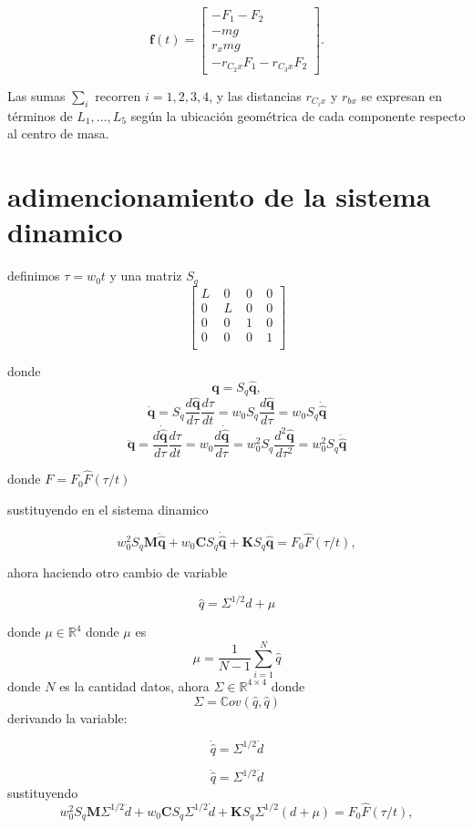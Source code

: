 \[
\mathbf f(t)=\begin{bmatrix} -F_1-F_2\\ -mg\\ r_xmg\\ -r_{C_2x}F_1-r_{C_3x}F_2\end{bmatrix}.
\]

Las sumas $\sum_i$ recorren $i=1,2,3,4$, y las distancias $r_{C_ix}$ y $r_{bx}$ se expresan en términos de $L_1,\ldots,L_5$ según la ubicación geométrica de cada componente respecto al centro de masa.

\section{adimencionamiento de la sistema dinamico}
definimos $\tau=w_0 t$ y una matriz $S_q$
\[
\begin{bmatrix}
L \; & 0 \; & 0 \; & 0 \\
0 \; & L \; & 0 \; & 0 \\
0 \; & 0 \; & 1 \; & 0 \\
0 \; & 0 \; & 0 \; & 1 \\
\end{bmatrix}
\]

donde 
\[
\mathbf q=S_q \hat{\mathbf q},
\] 
\[
\dot{\mathbf q}=S_q \frac{d \hat{\mathbf q}}{d \tau}\frac{d \tau}{d t}=w_0 S_q \frac{d \hat{\mathbf q}}{d \tau}=w_0 S_q \dot{\hat{\mathbf q}}
\]
\[
\ddot{\mathbf q}=\frac{d \dot{\hat{\mathbf q}}}{d \tau}\frac{d \tau}{d t}=w_0 \frac{d \dot{\hat{\mathbf q}}}{d \tau}=w_0^2 S_q  \frac{d^2 \hat{\mathbf q}}{d \tau^2}=w_0^2 S_q \ddot{\hat{\mathbf q}}
\]

donde $F=F_0 \hat{F}(\tau/t)$

sustituyendo en el sistema dinamico

\[
w_0^2 S_q \mathbf M \ddot{\hat{\mathbf q}}+w_0 \mathbf C  S_q \dot{\hat{\mathbf q}} +\mathbf K S_q \hat{\mathbf q}=F_0 \hat{F}(\tau/t),
\]

ahora haciendo otro cambio de variable 

\[
\hat{q}=\Sigma^{1/2} d+\mu
\]

donde $\mu \in \mathbb{R}^4$ donde $\mu$ es 
\[
\mu=\frac{1}{N-1}\sum_{i=1}^{N} \hat{q} 
\]
donde $N$ es la cantidad datos, ahora $\Sigma \in \mathbb{R}^{4 \times 4}$ donde
\[
\Sigma = \mathbb{C}ov(\hat{q}, \hat{q})
\]
derivando la variable:

\[
\dot{\hat{q}}=\Sigma^{1/2} \dot d
\]

\[
 \ddot{\hat{q}}=\Sigma^{1/2} \ddot d
\]
sustituyendo
\[
w_0^2 S_q \mathbf M \Sigma^{1/2}\ddot d +w_0 \mathbf C  S_q \Sigma^{1/2}\dot d  +\mathbf K S_q \Sigma^{1/2} \left(d+\mu\right)=F_0 \hat{F}(\tau/t),
\]

